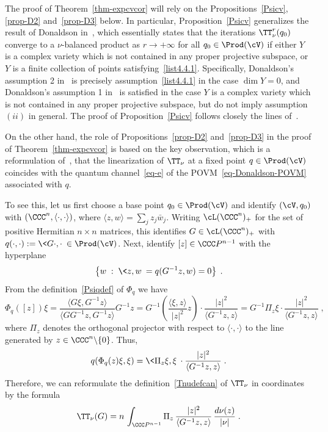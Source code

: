 The proof of Theorem~\ref{thm-expcvcor} will rely on the Propositions~\ref{Psicv}, \ref{prop-D2} and~\ref{prop-D3} below. In particular, Proposition~\ref{Psicv} generalizes the result of Donaldson in~\cite[p.~581]{D}, which essentially states that the iterations $\TT_\nu^r(q_0)$ converge to a $\nu$-balanced product as $r\rightarrow+\infty$ for all $q_0\in\Prod(\cV)$ if either $Y$ is a complex variety which is not contained in any proper projective subspace, or $Y$ is a finite collection of points satisfying~\eqref{list4.4.1}. Specifically, Donaldson's assumption 2 in~\cite[p.~581]{D} is precisely assumption~\eqref{list4.4.1} in the case $\dim Y=0$, and Donaldson's assumption 1 in~\cite[p.~581]{D} is satisfied in the case $Y$ is a complex variety which is not contained in any proper projective subspace, but do not imply assumption $(ii)$ in general. The proof of Proposition~\ref{Psicv} follows closely the lines of~\cite[p.~581]{D}.

On the other hand, the role of Propositions~\ref{prop-D2} and~\ref{prop-D3} in the proof of Theorem~\ref{thm-expcvcor} is based on the key observation, which is a reformulation of~\cite[p.~609]{D}, that the linearization of $\TT_\nu$ at a fixed point $q\in\Prod(\cV)$ coincides with the quantum channel~\eqref{eq-e} of the POVM~\eqref{eq-Donaldson-POVM} associated with $q$.

To see this, let us first choose a base point $q_0\in\Prod(\cV)$ and identify $(\cV,q_0)$ with $(\CCC^n, \langle\cdot,\cdot\rangle)$, where $\langle z,w\rangle = \sum_j z_j\bar{w}_j$. Writing $\cL(\CCC^n)_+$ for the set of positive Hermitian $n \times n$ matrices, this identifies $G \in \cL(\CCC^n)_+$ with $q(\cdot,\cdot):= \<G\cdot,\cdot\>\in\Prod(\cV)$. Next, identify $[z] \in \CCC P^{n-1}$ with the hyperplane
\[
\left\{w\;:\; \< z,w\>= q(G^{-1}z,w) = 0\right\}\;.
\]
From the definition~\eqref{Psiqdef} of $\Phi_q$ we have
\[
\Phi_q([z])\xi = \frac{\langle G\xi,G^{-1}z \rangle}{\langle GG^{-1}z,G^{-1}z\rangle} G^{-1}z
=G^{-1} \left(\frac{\langle \xi,z\rangle}{|z|^2}z\right) \cdot \frac{|z|^2}{\langle G^{-1}z,z\rangle}
=G^{-1}\Pi_z\xi \cdot \frac{|z|^2}{\langle G^{-1}z,z\rangle } \;,
\]
where $\Pi_z$ denotes the orthogonal projector with respect to $\langle \cdot,\cdot\rangle$ to the line generated by $z \in \CCC^n\backslash\{0\}$. Thus,
\[
q(\Phi_q(z)\xi,\xi) = \<\Pi_z\xi,\xi\> \cdot \frac{|z|^2}{\langle G^{-1}z,z\rangle} \;.
\]
Therefore, we can reformulate the definition~\eqref{Tnudefcan} of $\TT_\nu$ in coordinates by the formula
\begin{equation}\label{Tnudef}
\TT_\nu(G)=n\,\int_{\CCC P^{n-1}} \Pi_z\,\frac{|z|^2} {\langle G^{-1} z,z\rangle }\,\frac{d\nu(z)}{|\nu|}\;.
\end{equation}



